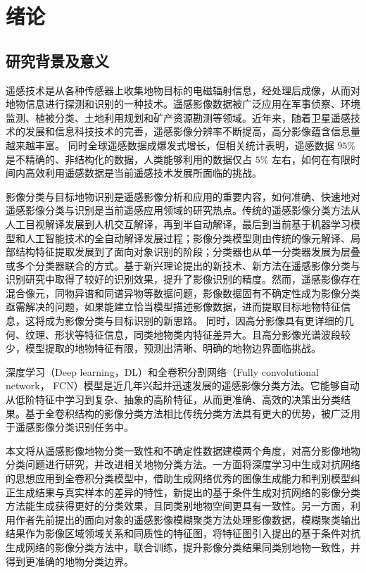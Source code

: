 
\chapter{绪论}
\label{cha:chap01}

\section{研究背景及意义}
\label{sec:first}
%

遥感技术是从各种传感器上收集地物目标的电磁辐射信息，经处理后成像，从而对地物信息进行探测和识别的一种技术。遥感影像数据被广泛应用在军事侦察、环境监测、植被分类、土地利用规划和矿产资源勘测等领域\cite{lishihua2005}。近年来，随着卫星遥感技术的发展和信息科技技术的完善，遥感影像分辨率不断提高，高分影像蕴含信息量越来越丰富。 同时全球遥感数据成爆发式增长，但相关统计表明，遥感数据 $95\%$ 是不精确的、非结构化的数据，人类能够利用的数据仅占 $5\%$ 左右\cite{zhangjun2010}，如何在有限时间内高效利用遥感数据是当前遥感技术发展所面临的挑战。

影像分类与目标地物识别是遥感影像分析和应用的重要内容，如何准确、快速地对遥感影像分类与识别是当前遥感应用领域的研究热点。传统的遥感影像分类方法从人工目视解译发展到人机交互解译，再到半自动解译，最后到当前基于机器学习模型和人工智能技术的全自动解译发展过程；影像分类模型则由传统的像元解译、局部结构特征提取发展到了面向对象识别的阶段；分类器也从单一分类器发展为层叠或多个分类器联合的方式\cite{lideren2012}。基于新兴理论提出的新技术、新方法在遥感影像分类与识别研究中取得了较好的识别效果，提升了影像识别的精度。然而，遥感影像存在混合像元，同物异谱和同谱异物等数据问题\cite{wulun2006}，影像数据固有不确定性成为影像分类亟需解决的问题，如果能建立恰当模型描述影像数据，进而提取目标地物特征信息，这将成为影像分类与目标识别的新思路\cite{he2005comparison}。 同时，因高分影像具有更详细的几何、纹理、形状等特征信息，同类地物类内特征差异大。且高分影像光谱波段较少，模型提取的地物特征有限，预测出清晰、明确的地物边界面临挑战。


深度学习（Deep learning，DL）\cite{hinton2006fast}和全卷积分割网络（Fully convolutional network， FCN）\cite{long2015fully}模型是近几年兴起并迅速发展的遥感影像分类方法。它能够自动从低阶特征中学习到复杂、抽象的高阶特征，从而更准确、高效的决策出分类结果。基于全卷积结构的影像分类方法相比传统分类方法具有更大的优势，被广泛用于遥感影像分类识别任务中。

本文将从遥感影像地物分类一致性和不确定性数据建模两个角度，对高分影像地物分类问题进行研究，并改进相关地物分类方法。一方面将深度学习中生成对抗网络的思想应用到全卷积分类模型中，借助生成网络优秀的图像生成能力和判别模型纠正生成结果与真实样本的差异的特性，新提出的基于条件生成对抗网络的影像分类方法能生成获得更好的分类效果，且同类别地物空间更具有一致性。另一方面，利用作者先前提出的面向对象的遥感影像模糊聚类方法处理影像数据，模糊聚类输出结果作为影像区域领域关系和同质性的特征图，将特征图引入提出的基于条件对抗生成网络的影像分类方法中，联合训练，提升影像分类结果同类别地物一致性，并得到更准确的地物分类边界。



